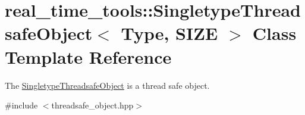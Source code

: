 \hypertarget{classreal__time__tools_1_1SingletypeThreadsafeObject}{}\section{real\+\_\+time\+\_\+tools\+:\+:Singletype\+Threadsafe\+Object$<$ Type, S\+I\+ZE $>$ Class Template Reference}
\label{classreal__time__tools_1_1SingletypeThreadsafeObject}


The \hyperlink{classreal__time__tools_1_1SingletypeThreadsafeObject}{Singletype\+Threadsafe\+Object} is a thread safe object.  




{\ttfamily \#include $<$threadsafe\+\_\+object.\+hpp$>$}


